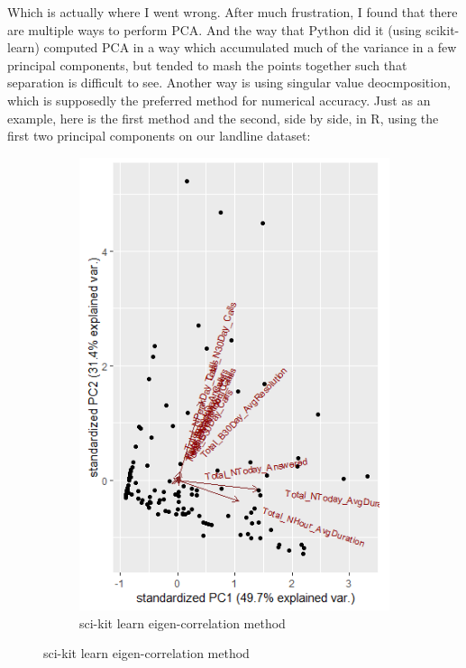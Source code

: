 \documentclass[20pt]{article} %
\begin{document}
\newpage
Which is actually where I went wrong. After much frustration, I found that there are multiple ways to perform PCA.  And the way that Python did it (using scikit-learn) computed PCA in a way which accumulated much of the variance in a few principal components, but tended to mash the points together such that separation is difficult to see.  Another way is using singular value deocmposition, which is supposedly the preferred method for numerical accuracy. Just as an example, here is the first method and the second, side by side, in R, using the first two principal components on our landline dataset:
\begin{figure}[!htbp]
  	\centering
   	\begin{subfigure}[p]{0.45\linewidth}
    	\includegraphics[width=\linewidth]{../figures/R/Rplot.png}
	\caption{sci-kit learn eigen-correlation method}

\end{subfigure}
\end{figure}
\end{document}
